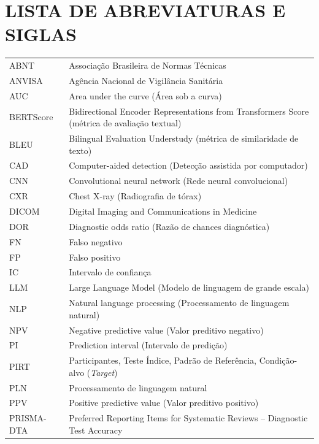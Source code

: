 \documentclass[12pt,a4paper]{article}
\begin{document}
\newpage
\tableofcontents
\newpage

\listoffigures
\newpage
\listoftables
\newpage

\section*{LISTA DE ABREVIATURAS E SIGLAS}
\begin{singlespace}
\begin{tabular}{lp{12cm}}
ABNT & Associação Brasileira de Normas Técnicas \\
ANVISA & Agência Nacional de Vigilância Sanitária \\
AUC & Area under the curve (Área sob a curva) \\
BERTScore & Bidirectional Encoder Representations from Transformers Score (métrica de avaliação textual) \\
BLEU & Bilingual Evaluation Understudy (métrica de similaridade de texto) \\
CAD & Computer-aided detection (Detecção assistida por computador) \\
CNN & Convolutional neural network (Rede neural convolucional) \\
CXR & Chest X-ray (Radiografia de tórax) \\
DICOM & Digital Imaging and Communications in Medicine \\
DOR & Diagnostic odds ratio (Razão de chances diagnóstica) \\
FN & Falso negativo \\
FP & Falso positivo \\
IC & Intervalo de confiança \\
LLM & Large Language Model (Modelo de linguagem de grande escala) \\
NLP & Natural language processing (Processamento de linguagem natural) \\
NPV & Negative predictive value (Valor preditivo negativo) \\
PI & Prediction interval (Intervalo de predição) \\
PIRT & Participantes, Teste Índice, Padrão de Referência, Condição-alvo (\textit{Target}) \\
PLN & Processamento de linguagem natural \\
PPV & Positive predictive value (Valor preditivo positivo) \\
PRISMA-DTA & Preferred Reporting Items for Systematic Reviews -- Diagnostic Test Accuracy \\

\end{tabular}
\end{singlespace}
\end{document}
